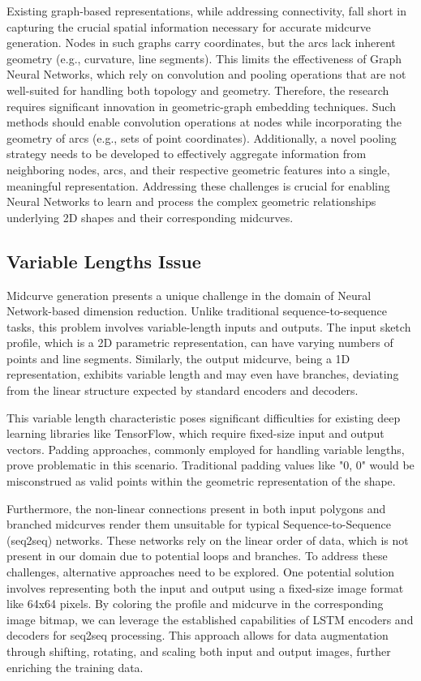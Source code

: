 \documentclass[conference]{IEEEtran}
\begin{document}
Existing graph-based representations, while addressing connectivity, fall short in capturing the crucial spatial information necessary for accurate midcurve generation. Nodes in such graphs carry coordinates, but the arcs lack inherent geometry (e.g., curvature, line segments). This limits the effectiveness of Graph Neural Networks, which rely on convolution and pooling operations that are not well-suited for handling both topology and geometry.
Therefore, the research requires significant innovation in geometric-graph embedding techniques. Such methods should enable convolution operations at nodes while incorporating the geometry of arcs (e.g., sets of point coordinates). Additionally, a novel pooling strategy needs to be developed to effectively aggregate information from neighboring nodes, arcs, and their respective geometric features into a single, meaningful representation. Addressing these challenges is crucial for enabling Neural Networks to learn and process the complex geometric relationships underlying 2D shapes and their corresponding midcurves.

\subsection{Variable Lengths Issue}
\label{subsec:5}

Midcurve generation presents a unique challenge in the domain of Neural Network-based dimension reduction. Unlike traditional sequence-to-sequence tasks, this problem involves variable-length inputs and outputs. The input sketch profile, which is a 2D parametric representation, can have varying numbers of points and line segments. Similarly, the output midcurve, being a 1D representation, exhibits variable length and may even have branches, deviating from the linear structure expected by standard encoders and decoders.


This variable length characteristic poses significant difficulties for existing deep learning libraries like TensorFlow, which require fixed-size input and output vectors. Padding approaches, commonly employed for handling variable lengths, prove problematic in this scenario. Traditional padding values like "0, 0" would be misconstrued as valid points within the geometric representation of the shape.


Furthermore, the non-linear connections present in both input polygons and branched midcurves render them unsuitable for typical Sequence-to-Sequence (seq2seq) networks. These networks rely on the linear order of data, which is not present in our domain due to potential loops and branches.
To address these challenges, alternative approaches need to be explored. One potential solution involves representing both the input and output using a fixed-size image format like 64x64 pixels. By coloring the profile and midcurve in the corresponding image bitmap, we can leverage the established capabilities of LSTM encoders and decoders for seq2seq processing. This approach allows for data augmentation through shifting, rotating, and scaling both input and output images, further enriching the training data.
\end{document}
